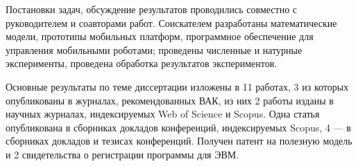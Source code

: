 {\contribution} Постановки задач, обсуждение результатов проводились совместно с руководителем и соавторами работ. Соискателем разработаны математические модели, прототипы мобильных платформ, программное обеспечение для управления мобильными роботами; проведены численные и натурные эксперименты, проведена обработка результатов экспериментов.

{\publications} Основные результаты по теме диссертации изложены в 11 работах, 3 из которых опубликованы в журналах, рекомендованных ВАК, из них 2 работы изданы в научных журналах, индексируемых Web of Science и Scopus. Одна статья опубликована в сборниках докладов конференций, индексируемых Scopus, 4 — в сборниках докладов и тезисах конференций. Получен патент на полезную модель и 2 свидетельства о регистрации программы для ЭВМ.

